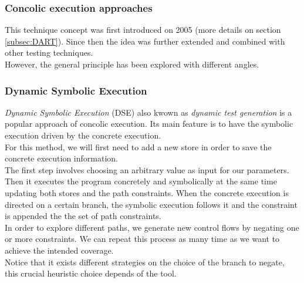 \documentclass[11pt]{IEEEtran}
\begin{document}
    	\subsubsection*{Concolic execution approaches}
    		This technique concept was first introduced on 2005 \cite{godefroid2005dart} (more details on section \ref{subsec:DART}). %
    	Since then the idea was further extended and combined with other testing techniques.\\

    	However, the general principle has been explored with different angles.

    		\subsubsection{Dynamic Symbolic Execution}
    		\label{subsec:dynamicSymbolicExec}
    			\emph{Dynamic Symbolic Execution} (DSE) also kwown as \emph{dynamic test generation} \cite{godefroid2005dart} is a popular approach of concolic execution. Its main feature is to have the symbolic execution driven by  the concrete execution.\\

    			For this method, we will first need to add a new store in order to save the concrete execution information.\\
    			The first step involves choosing an arbitrary value as input for our parameters. Then it executes the program concretely and symbolically at the same time updating both stores and the path constraints. When the concrete execution is directed on a certain branch, the symbolic execution follows it and the constraint is appended the the set of path constraints.\\
    			In order to explore different paths, we generate new control flows by negating one or more constraints. We can repeat this process as many time as we want to achieve the intended coverage.\\

    			Notice that it exists different strategies on the choice of the branch to negate, this crucial heuristic choice depends of the tool.\\
\end{document}
